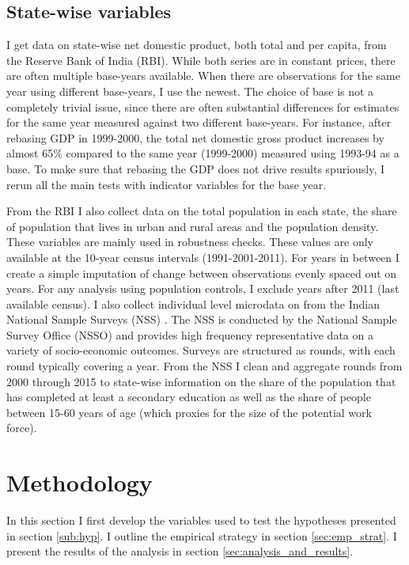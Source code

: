 \documentclass[11pt]{article}
\begin{document}
\subsection{State-wise variables}%
\label{sub:state_wise_variables}

I get data on state-wise net domestic product, both total and per capita, from the Reserve Bank of India (RBI). While both series are in constant prices, there are often multiple base-years available. When there are observations for the same year using different base-years, I use the newest. The choice of base is not a completely trivial issue, since there are often substantial differences for estimates for the same year measured against two different base-years. For instance, after rebasing GDP in 1999-2000, the total net domestic gross product increases by almost 65\% compared to the same year (1999-2000) measured using 1993-94 as a base. To make sure that rebasing the GDP does not drive results spuriously, I rerun all the main tests with indicator variables for the base year.

From the RBI I also collect data on the total population in each state, the share of population that lives in urban and rural areas and the population density. These variables are mainly used in robustness checks. These values are only available at the 10-year census intervals (1991-2001-2011). For years in between I create a simple imputation of change between observations evenly spaced out on years. For any analysis using population controls, I exclude years after 2011 (last available census). 
I also collect individual level microdata on from the Indian National Sample Surveys (NSS) \citep{nsso_national_2000}. The NSS is conducted by the National Sample Survey Office (NSSO) and provides high frequency representative data on a variety of socio-economic outcomes. Surveys are structured as rounds, with each round typically covering a year. From the NSS I clean and aggregate rounds from 2000 through 2015 to state-wise information on the share of the population that has completed at least a secondary education as well as the share of people between 15-60 years of age (which proxies for the size of the potential work force).


\newpage

\section{Methodology}%
\label{sub:methodology}
In this section I first develop the variables used to test the hypotheses presented in section \ref{sub:hyp}. I outline the empirical strategy in section \ref{sec:emp_strat}. I present the results of the analysis in section \ref{sec:analysis_and_results}.
\end{document}
